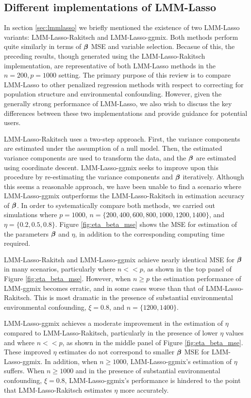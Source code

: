 \subsection{Different implementations of LMM-Lasso}

In section \ref{sec:lmmlasso} we briefly mentioned the existence of two LMM-Lasso variants: LMM-Lasso-Rakitsch and LMM-Lasso-ggmix. Both methods perform quite similarly in terms of $\boldsymbol{\beta}{}$ MSE and variable selection. Becasue of this, the preceding results, though generated using the LMM-Lasso-Rakitsch implementation, are representative of both LMM-Lasso methods in the $n = 200, p = 1000$ setting. The primary purpose of this review is to compare LMM-Lasso to other penalized regression methods with respect to correcting for population structure and environmental confounding. However, given the generally strong performance of LMM-Lasso, we also wish to discuss the key differences between these two implementations and provide guidance for potential users.

LMM-Lasso-Rakitsch uses a two-step approach. First, the variance components are estimated under the assumption of a null model. Then, the estimated variance components are used to transform the data, and the $\boldsymbol{\beta}{}$ are estimated using coordinate descent. LMM-Lasso-ggmix seeks to improve upon this procedure by re-estimating the variance components and $\boldsymbol{\beta}{}$ iteratively. Although this seems a reasonable approach, we have been unable to find a scenario where LMM-Lasso-ggmix outperforms the LMM-Lasso-Rakitsch in estimation accuracy of $\boldsymbol{\beta}{}$. In order to systematically compare both methods, we carried out simulations where $p = 1000$, $n = \{200, 400, 600, 800, 1000, 1200, 1400\}$, and $\eta = \{0.2, 0.5, 0.8\}$. Figure \ref{fig:eta_beta_mse} shows the MSE for estimation of the parameters $\boldsymbol{\beta}{}$ and $\eta$, in addition to the corresponding computing time required. 

LMM-Lasso-Rakitsh and LMM-Lasso-ggmix achieve nearly identical MSE for $\boldsymbol{\beta}{}$ in many scenarios, particularly where $n << p$, as shown in the top panel of Figure \ref{fig:eta_beta_mse}. However, when $n \ge p$ the estimation performance of LMM-ggmix becomes erratic, and in some cases worse than that of LMM-Lasso-Rakitsch. This is most dramatic in the presence of substantial environmental environmental confounding, $\xi = 0.8$, and $n = \{1200, 1400\}$. 

LMM-Lasso-ggmix achieves a moderate improvement in the estimation of $\eta$ compared to LMM-Lasso-Rakitsch, particularly in the presence of lower $\eta$ values and where $n << p$, as shown in the middle panel of Figure \ref{fig:eta_beta_mse}. These improved $\eta$ estimates do not correspond to smaller $\boldsymbol{\beta}{}$ MSE for LMM-Lasso-ggmix. In addition, when $n \ge 1000$, LMM-Lasso-ggmix's estimation of $\eta$ suffers. When $n \ge 1000$ and in the presence of substantial environmental confounding, $\xi = 0.8$,  LMM-Lasso-ggmix's performance is hindered to the point that LMM-Lasso-Rakitsch estimates $\eta$ more accurately.

